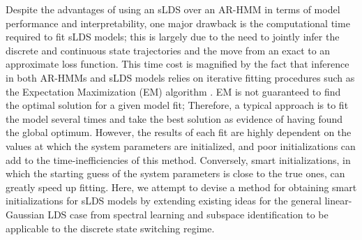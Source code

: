 Despite the advantages of using an sLDS over an AR-HMM in terms of model performance and interpretability, one major drawback is the computational time required to fit sLDS models; this is largely due to the need to jointly infer the discrete and continuous state trajectories and the move from an exact to an approximate loss function. This time cost is magnified by the fact that inference in both AR-HMMs and sLDS models relies on iterative fitting procedures such as the Expectation Maximization (EM) algorithm \cite{baum_maximization_1970, dempster_maximum_1977, shumway_approach_1982, bishop_pattern_2006, escola_hidden_2011}. EM is not guaranteed to find the optimal solution for a given model fit; Therefore, a typical approach is to fit the model several times and take the best solution as evidence of having found the global optimum. However, the results of each fit are highly dependent on the values at which the system parameters are initialized, and poor initializations can add to the time-inefficiencies of this method. Conversely, smart initializations, in which the starting guess of the system parameters is close to the true ones, can greatly speed up fitting. Here, we attempt to devise a method for obtaining smart initializations for sLDS models by extending existing ideas for the general linear-Gaussian LDS case from spectral learning \cite{martens_learning_2010, anandkumar_tensor_2014, belanger_linear_2015, hazan_learning_2017, hazan_spectral_2018} and subspace identification \cite{ho_editorial_1966, van_overschee_n4sid_1994, viberg_subspace-based_1995, van_overschee_subspace_1996, qin_overview_2006} to be applicable to the discrete state switching regime. 


